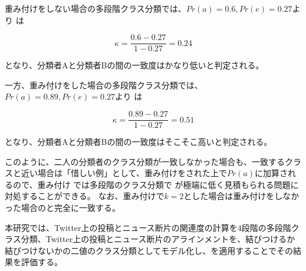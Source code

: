 \documentclass[12pt]{jarticle}
\begin{document}
重み付けをしない場合の多段階クラス分類では、$Pr(a) = 0.6, Pr(e) = 0.27$より \kappac は

\begin{equation}
  \kappa = \frac{0.6 - 0.27}{1 - 0.27} = 0.24
\end{equation}

となり、分類者Aと分類者Bの間の一致度はかなり低いと判定される。

一方、重み付けをした場合の多段階クラス分類では、$Pr(a) = 0.89, Pr(e) = 0.27$より \kappac は

\begin{equation}
  \kappa = \frac{0.89 - 0.27}{1 - 0.27} = 0.51
\end{equation}

となり、分類者Aと分類者Bの間の一致度はそこそこ高いと判定される。

このように、二人の分類者のクラス分類が一致しなかった場合も、一致するクラスと近い場合は「惜しい例」として、重み付けをされた上で$Pr(a)$に加算されるので、重み付け \kappac では多段階のクラス分類で \kappac が極端に低く見積もられる問題に対処することができる。
なお、重み付け\kappac で$k=2$とした場合は重み付けをしなかった場合の\kappac と完全に一致する。


本研究では、Twitter上の投稿とニュース断片の関連度の計算を4段階の多段階クラス分類、Twitter上の投稿とニュース断片のアラインメントを、結びつけるか結びつけないかの二値のクラス分類としてモデル化し、\kappac を適用することでその結果を評価する。



\end{document}
